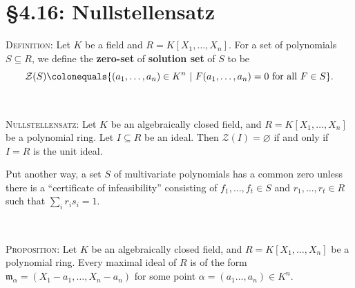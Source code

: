 \documentclass[12pt]{amsart}
\newcommand{\m}{\mathfrak{m}}
\newcommand{\1}{\mathbbm{1}}
\newcommand{\cZ}{\mathcal{Z}}
\newcommand{\showsol}[1]{\def\displaysol{#1}}
\newcommand\ceq{\colonequals}
\begin{document}
\showsol{0}
	
	\thispagestyle{empty}
	
	\section*{\S4.16: Nullstellensatz}	

\begin{framed}

\noindent \textsc{Definition:} Let $K$ be a field and $R=K[X_1,\dots,X_n]$. For a set of polynomials $S\subseteq R$, we define the \textbf{zero-set} of \textbf{solution set} of $S$ to be
\[ \cZ(S) \ceq \{ (a_1,\dots,a_n)\in K^n \ | \ F(a_1,\dots,a_n)=0 \ \text{for all} \ F\in S\}.\]

\

\noindent \textsc{Nullstellensatz:} Let $K$ be an algebraically closed field, and $R=K[X_1,\dots,X_n]$ be a polynomial ring. Let $I\subseteq R$ be an ideal. Then $\cZ(I)=\varnothing$ if and only if $I=R$ is the unit ideal. 

Put another way, a set $S$ of multivariate polynomials has a common zero unless there is a ``certificate of infeasibility'' consisting of $f_1,\dots,f_t\in S$ and $r_1,\dots,r_t\in R$ such that $\sum_i r_i s_i = 1$.

\

\noindent \textsc{Proposition:} Let $K$ be an algebraically closed field, and $R=K[X_1,\dots,X_n]$ be a polynomial ring. Every maximal ideal of $R$ is of the form $\m_\alpha = (X_1-a_1,\dots,X_n-a_n)$ for some point $\alpha=(a_1\dots,a_n)\in K^n$.

\end{framed}
\end{document}
